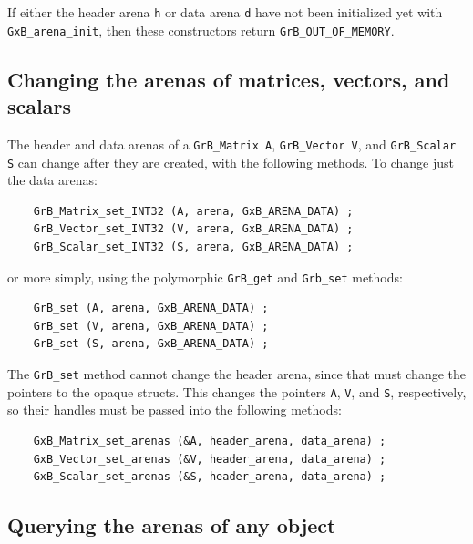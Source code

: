 If either the header arena \verb'h' or data arena \verb'd' have not been
initialized yet with \verb'GxB_arena_init', then these constructors return
\verb'GrB_OUT_OF_MEMORY'.

\subsection{Changing the arenas of matrices, vectors, and scalars}

The header and data arenas of a \verb'GrB_Matrix A', \verb'GrB_Vector V', and
\verb'GrB_Scalar S' can change after they are created, with the following
methods.  To change just the data arenas:

{\footnotesize
\begin{verbatim}
    GrB_Matrix_set_INT32 (A, arena, GxB_ARENA_DATA) ;
    GrB_Vector_set_INT32 (V, arena, GxB_ARENA_DATA) ;
    GrB_Scalar_set_INT32 (S, arena, GxB_ARENA_DATA) ;
\end{verbatim}}

\noindent
or more simply, using the polymorphic \verb'GrB_get' and \verb'Grb_set'
methods:

{\footnotesize
\begin{verbatim}
    GrB_set (A, arena, GxB_ARENA_DATA) ;
    GrB_set (V, arena, GxB_ARENA_DATA) ;
    GrB_set (S, arena, GxB_ARENA_DATA) ;
\end{verbatim}}

The \verb'GrB_set' method cannot change the header arena, since that must
change the pointers to the opaque structs.  This changes the pointers \verb'A',
\verb'V', and \verb'S', respectively, so their handles must be passed into the
following methods:

{\footnotesize
\begin{verbatim}
    GxB_Matrix_set_arenas (&A, header_arena, data_arena) ;
    GxB_Vector_set_arenas (&V, header_arena, data_arena) ;
    GxB_Scalar_set_arenas (&S, header_arena, data_arena) ;
\end{verbatim}}

\subsection{Querying the arenas of any object}

